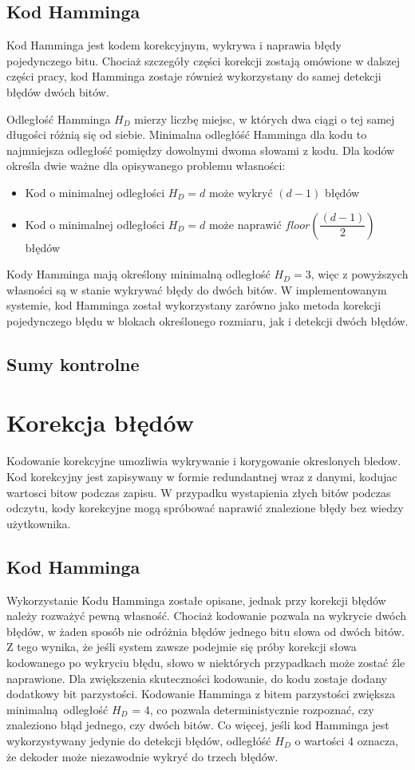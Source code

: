 \subsection{Kod Hamminga}
Kod Hamminga jest kodem korekcyjnym, wykrywa i naprawia błędy pojedynczego bitu. Chociaż szczegóły części korekcji zostają omówione w dalszej części pracy, kod Hamminga zostaje również wykorzystany do samej detekcji błędów dwóch bitów.

Odległość Hamminga $H_D$ mierzy liczbę miejsc, w których dwa ciągi o tej samej długości różnią się od siebie. Minimalna odległóść Hamminga dla kodu to najmniejsza odległość pomiędzy dowolnymi dwoma słowami z kodu. Dla kodów określa dwie ważne dla opisywanego problemu własności:
\begin{itemize}
        \item Kod  o minimalnej odległości $H_D = d$ może wykryć $(d-1)$ błędów
        \item Kod o minimalnej odległości $H_D = d$ może naprawić $floor\left(\dfrac{(d-1)}{2}\right)$ błędów
\end{itemize}
Kody Hamminga mają określony minimalną odległość $H_D = 3$, więc z powyższych własności są w stanie wykrywać błędy do dwóch bitów.  W implementowanym systemie, kod Hamminga został wykorzystany zarówno jako metoda korekcji pojedynczego błędu w blokach określonego rozmiaru, jak i detekcji dwóch błędów.


\subsection{Sumy kontrolne}
    
\section {Korekcja błędów}
Kodowanie korekcyjne umozliwia wykrywanie i korygowanie okreslonych bledow. Kod korekcyjny jest zapisywany w formie redundantnej wraz z danymi, kodujac wartosci bitow podczas zapisu. W przypadku wystapienia złych bitów podczas odczytu, kody korekcyjne mogą spróbować naprawić znalezione błędy bez wiedzy użytkownika.
\subsection{Kod Hamminga}
Wykorzystanie Kodu Hamminga zostałe opisane, jednak przy korekcji błędów należy rozważyć pewną własność. Chociaż kodowanie pozwala na wykrycie dwóch błędów, w żaden sposób nie odróżnia błędów jednego bitu słowa od dwóch bitów. Z tego wynika, że jeśli system zawsze podejmie się próby korekcji słowa kodowanego po wykryciu błędu, słowo w niektórych przypadkach może zostać źle naprawione.
Dla zwiększenia skuteczności kodowanie, do kodu zostaje dodany dodatkowy bit parzystości. Kodowanie Hamminga z bitem parzystości zwiększa minimalną odległość $H_D$ = 4, co pozwala deterministycznie rozpoznać, czy znaleziono błąd jednego, czy dwóch bitów. Co więcej, jeśli kod Hamminga jest wykorzystywany jedynie do detekcji błędów, odległóść $H_D$ o wartości 4 oznacza, że dekoder może niezawodnie wykryć do trzech błędów.  
